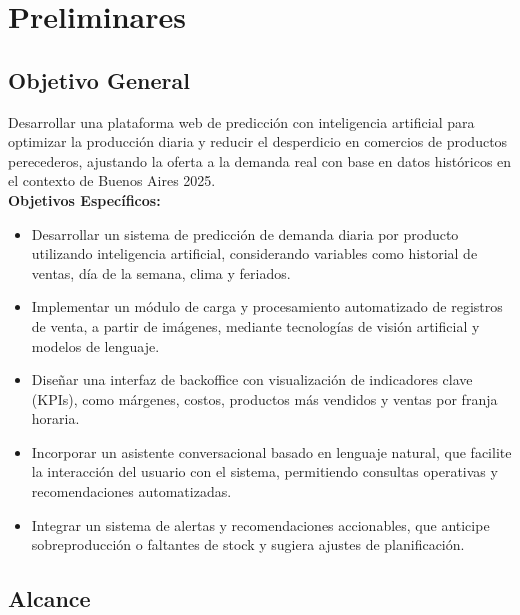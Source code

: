 \chapter{Preliminares}\label{chapter02}

\section{Objetivo General}

Desarrollar una plataforma web de predicción con inteligencia artificial para optimizar la producción diaria y reducir el desperdicio en comercios de productos perecederos, ajustando la oferta a la demanda real con base en datos históricos en el contexto de Buenos Aires 2025.\\

\noindent\textbf{Objetivos Específicos:}

\begin{itemize}
    \item Desarrollar un sistema de predicción de demanda diaria por producto utilizando inteligencia artificial, considerando variables como historial de ventas, día de la semana, clima y feriados.
    
    \item Implementar un módulo de carga y procesamiento automatizado de registros de venta, a partir de imágenes, mediante tecnologías de visión artificial y modelos de lenguaje.
    
    \item Diseñar una interfaz de backoffice con visualización de indicadores clave (KPIs), como márgenes, costos, productos más vendidos y ventas por franja horaria.
    
    \item Incorporar un asistente conversacional basado en lenguaje natural, que facilite la interacción del usuario con el sistema, permitiendo consultas operativas y recomendaciones automatizadas.
    
    \item Integrar un sistema de alertas y recomendaciones accionables, que anticipe sobreproducción o faltantes de stock y sugiera ajustes de planificación.
    
\end{itemize}

\section{Alcance}

